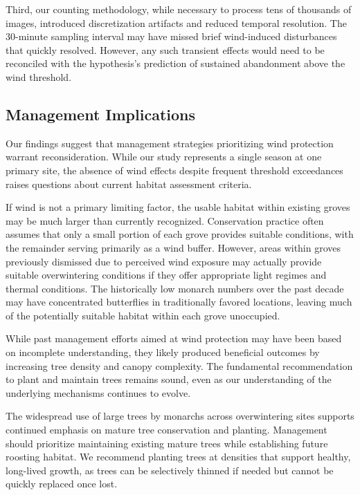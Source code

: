 Third, our counting methodology, while necessary to process tens of thousands of images, introduced discretization artifacts and reduced temporal resolution. The 30-minute sampling interval may have missed brief wind-induced disturbances that quickly resolved. However, any such transient effects would need to be reconciled with the hypothesis's prediction of sustained abandonment above the wind threshold.

\subsection{Management Implications}

Our findings suggest that management strategies prioritizing wind protection warrant reconsideration. While our study represents a single season at one primary site, the absence of wind effects despite frequent threshold exceedances raises questions about current habitat assessment criteria.

If wind is not a primary limiting factor, the usable habitat within existing groves may be much larger than currently recognized. Conservation practice often assumes that only a small portion of each grove provides suitable conditions, with the remainder serving primarily as a wind buffer. However, areas within groves previously dismissed due to perceived wind exposure may actually provide suitable overwintering conditions if they offer appropriate light regimes and thermal conditions. The historically low monarch numbers over the past decade may have concentrated butterflies in traditionally favored locations, leaving much of the potentially suitable habitat within each grove unoccupied.

While past management efforts aimed at wind protection may have been based on incomplete understanding, they likely produced beneficial outcomes by increasing tree density and canopy complexity. The fundamental recommendation to plant and maintain trees remains sound, even as our understanding of the underlying mechanisms continues to evolve.

The widespread use of large trees by monarchs across overwintering sites supports continued emphasis on mature tree conservation and planting. Management should prioritize maintaining existing mature trees while establishing future roosting habitat. We recommend planting trees at densities that support healthy, long-lived growth, as trees can be selectively thinned if needed but cannot be quickly replaced once lost.


